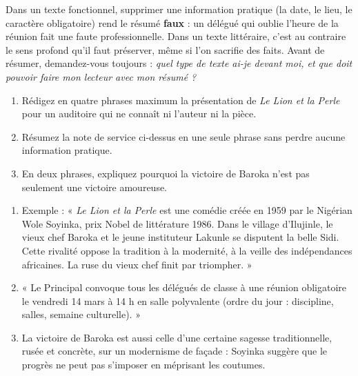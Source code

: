 \documentclass[11pt]{article}
\begin{document}
\begin{attention}
Dans un texte fonctionnel, supprimer une information pratique (la date, le lieu, le caractère obligatoire) rend le résumé \textbf{faux} : un délégué qui oublie l'heure de la réunion fait une faute professionnelle. Dans un texte littéraire, c'est au contraire le sens profond qu'il faut préserver, même si l'on sacrifie des faits. Avant de résumer, demandez-vous toujours : \emph{quel type de texte ai-je devant moi, et que doit pouvoir faire mon lecteur avec mon résumé ?}
\end{attention}

\begin{exercice}
\begin{enumerate}
\item Rédigez en quatre phrases maximum la présentation de \emph{Le Lion et la Perle} pour un auditoire qui ne connaît ni l'auteur ni la pièce.
\item Résumez la note de service ci-dessus en une seule phrase sans perdre aucune information pratique.
\item En deux phrases, expliquez pourquoi la victoire de Baroka n'est pas seulement une victoire amoureuse.
\end{enumerate}
\end{exercice}

\begin{corrige}[Exercice]
\begin{enumerate}
\item Exemple : « \emph{Le Lion et la Perle} est une comédie créée en 1959 par le Nigérian Wole Soyinka, prix Nobel de littérature 1986. Dans le village d'Ilujinle, le vieux chef Baroka et le jeune instituteur Lakunle se disputent la belle Sidi. Cette rivalité oppose la tradition à la modernité, à la veille des indépendances africaines. La ruse du vieux chef finit par triompher. »
\item « Le Principal convoque tous les délégués de classe à une réunion obligatoire le vendredi 14 mars à 14 h en salle polyvalente (ordre du jour : discipline, salles, semaine culturelle). »
\item La victoire de Baroka est aussi celle d'une certaine sagesse traditionnelle, rusée et concrète, sur un modernisme de façade : Soyinka suggère que le progrès ne peut pas s'imposer en méprisant les coutumes.
\end{enumerate}
\end{corrige}
\end{document}
